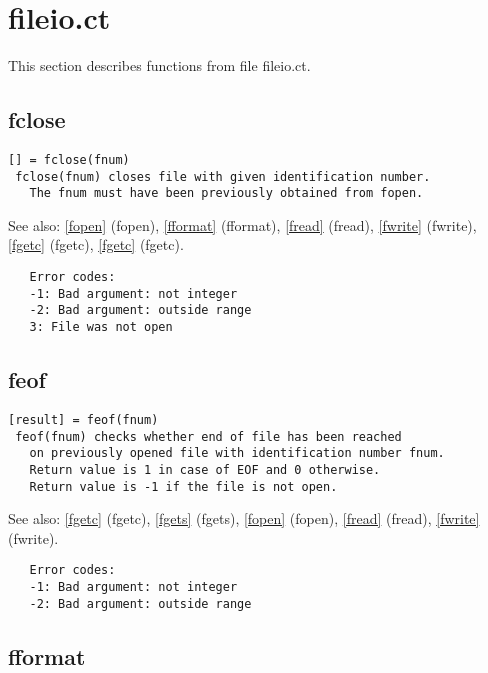 \documentclass[a4paper]{article}
\begin{document}
\section{fileio.ct}

This section describes functions from file fileio.ct.




\subsection{fclose\label{fclose}}

\begin{tscreen}
\begin{verbatim}
[] = fclose(fnum)
 fclose(fnum) closes file with given identification number.
   The fnum must have been previously obtained from fopen.
\end{verbatim}

See also: \ref{fopen} {(fopen)}, \ref{fformat} {(fformat)}, \ref{fread} {(fread)}, \ref{fwrite} {(fwrite)}, \ref{fgetc} {(fgetc)}, \ref{fgetc} {(fgetc)}.
\begin{verbatim}
   Error codes:
   -1: Bad argument: not integer
   -2: Bad argument: outside range
   3: File was not open
\end{verbatim}
\end{tscreen}



\subsection{feof\label{feof}}

\begin{tscreen}
\begin{verbatim}
[result] = feof(fnum)
 feof(fnum) checks whether end of file has been reached
   on previously opened file with identification number fnum.
   Return value is 1 in case of EOF and 0 otherwise.
   Return value is -1 if the file is not open.
\end{verbatim}

See also: \ref{fgetc} {(fgetc)}, \ref{fgets} {(fgets)}, \ref{fopen} {(fopen)}, \ref{fread} {(fread)}, \ref{fwrite} {(fwrite)}.
\begin{verbatim}
   Error codes:
   -1: Bad argument: not integer
   -2: Bad argument: outside range
\end{verbatim}
\end{tscreen}



\subsection{fformat\label{fformat}}
\end{document}
